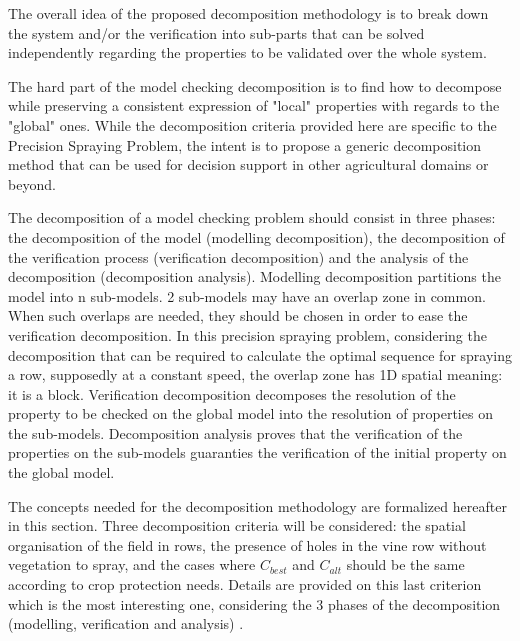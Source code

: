
The overall idea of the proposed decomposition methodology is to break down the system and/or the verification into sub-parts that can be solved independently regarding the properties to be validated over the whole system.


The hard part of the model checking decomposition is to find how to decompose while preserving a consistent expression of "local" properties with regards to the "global" ones. While the decomposition criteria provided here are specific to the Precision Spraying Problem, the intent is to propose a generic decomposition method that can be used for decision support in other agricultural domains or beyond.

The decomposition of a model checking problem should consist in three phases: the decomposition of the model (modelling decomposition), the decomposition of the verification process (verification decomposition) and the analysis of the decomposition (decomposition analysis). Modelling decomposition partitions the model into n sub-models. 2 sub-models may have an overlap zone in common. When such overlaps are needed, they should be chosen in order to ease the verification decomposition. In this precision spraying problem, considering the decomposition that can be required to calculate the optimal sequence for spraying a row, supposedly at a constant speed, the overlap zone has 1D spatial meaning: it is a block. 
Verification decomposition decomposes the resolution of the property to be checked on the global model into the resolution of properties on the sub-models. Decomposition analysis proves that the verification of the properties on the sub-models guaranties the verification of the initial property on the global model.

The concepts needed for the decomposition methodology are formalized hereafter in this section. Three decomposition criteria will be considered: the spatial organisation of the field in rows, the presence of holes in the vine row without vegetation to spray, and the cases where $C_{best}$ and $C_{alt}$ should be the same according to crop protection needs. Details are provided on this last criterion which is the most interesting one, considering the 3 phases of the decomposition (modelling, verification and analysis) .

